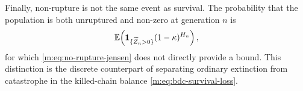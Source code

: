 Finally, non-rupture is not the same event as survival.  The probability that the
population is both unruptured and non-zero at generation $n$ is
\begin{equation}
  \mathbb{E}\!\left(\mathbf 1_{\{\widetilde Z_n>0\}}(1-\kappa)^{H_n}\right),
  \label{m:eq:joint-survival-no-rupture}
\end{equation}
for which \cref{m:eq:no-rupture-jensen} does not directly provide a bound.  This
distinction is the discrete counterpart of separating ordinary extinction from
catastrophe in the killed-chain balance \cref{m:eq:bdc-survival-loss}.

\FloatBarrier
